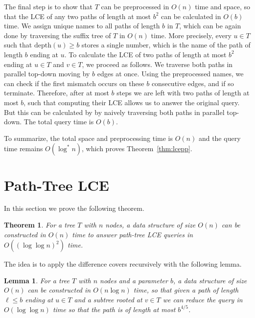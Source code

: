 \documentclass [10pt]{article}
\newtheorem{lemma}{Lemma}
\newtheorem{theorem}{Theorem}
\newcommand{\depth}{\ensuremath{\mathrm{depth}}}
\begin{document}
The final step is to show that $T$ can be preprocessed in $O(n)$ time and space, so that the LCE of any two
paths of length at most $b^{2}$ can be calculated in $O(b)$ time. We assign unique names to all paths of length $b$ in $T$, which can be
again done by traversing the suffix tree of $T$ in $O(n)$ time. More precisely, every $u\in T$ such that $\depth(u)\geq b$ stores
a single number, which is the name of the path of length $b$ ending at $u$. To calculate the LCE of
two paths of length at most $b^{2}$ ending at $u\in T$ and $v\in T$, we proceed as follows. We traverse both paths in parallel
top-down moving by $b$ edges at once. Using the preprocessed names, we can check if the first mismatch occurs on these $b$
consecutive edges, and if so terminate. Therefore, after at most $b$ steps we are left with two paths of length at most $b$, such
that computing their LCE allows us to answer the original query. But this can be calculated by
by naively traversing both paths in parallel top-down. The total query time is $O(b)$.

To summarize, the total space and preprocessing time is $O(n)$ and the query time remains $O(\log^{*}n)$, which proves
Theorem~\ref{thm:lcepp}.

\section{Path-Tree LCE}
\label{sec:path-tree}

In this section we prove the following theorem.
\begin{theorem}
For a tree $T$ with $n$ nodes, a data structure of size $O(n)$ can be constructed in $O(n)$ time to answer path-tree LCE queries in
$O((\log\log n)^{2})$ time. 
\label{thm:lcept}
\end{theorem}

\noindent The idea is to apply the difference covers recursively with the following lemma.

\begin{lemma}
For a tree $T$ with $n$ nodes and a parameter $b$, a data structure of size $O(n)$ can be constructed in $O(n\log n)$ time, so that given a path of
length $\ell \leq b$ ending at $u\in T$ and a subtree rooted at $v\in T$ we can reduce the query  in $O(\log\log n)$ time so that
the path is of length at most $b^{4/5}$.
\label{lem:path-tree reduction}
\end{lemma}
\end{document}
